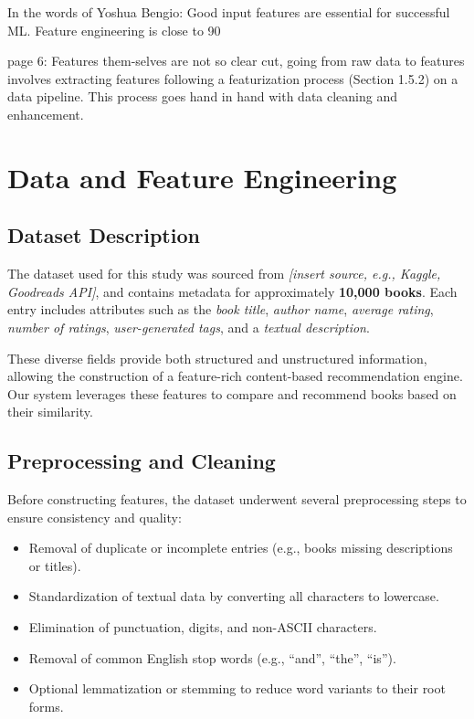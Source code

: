 In the words of Yoshua Bengio: 
Good input features are essential for successful ML. Feature engineering is close to
90%

page 6:
Features them-selves are not so clear cut, going from raw data to features involves extracting
features following a featurization process (Section 1.5.2) on a data pipeline.
This process goes hand in hand with data cleaning and enhancement.

\section{Data and Feature Engineering}

\subsection{Dataset Description}

The dataset used for this study was sourced from \textit{[insert source, e.g., Kaggle, Goodreads API]}, and contains metadata for approximately \textbf{10,000 books}. Each entry includes attributes such as the \textit{book title}, \textit{author name}, \textit{average rating}, \textit{number of ratings}, \textit{user-generated tags}, and a \textit{textual description}.

These diverse fields provide both structured and unstructured information, allowing the construction of a feature-rich content-based recommendation engine. Our system leverages these features to compare and recommend books based on their similarity.

\subsection{Preprocessing and Cleaning}

Before constructing features, the dataset underwent several preprocessing steps to ensure consistency and quality:

\begin{itemize}
	\item Removal of duplicate or incomplete entries (e.g., books missing descriptions or titles).
	\item Standardization of textual data by converting all characters to lowercase.
	\item Elimination of punctuation, digits, and non-ASCII characters.
	\item Removal of common English stop words (e.g., ``and'', ``the'', ``is'').
	\item Optional lemmatization or stemming to reduce word variants to their root forms.
\end{itemize}

